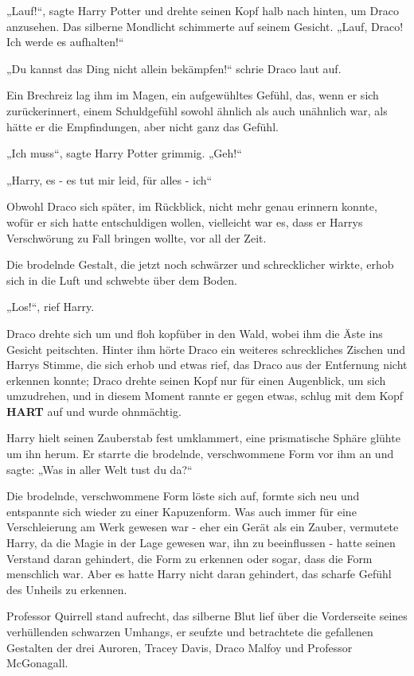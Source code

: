 {„Lauf!“, sagte Harry Potter und drehte seinen Kopf halb nach hinten, um Draco anzusehen. Das silberne Mondlicht schimmerte auf seinem Gesicht. „Lauf, Draco! Ich werde es aufhalten!“

„Du kannst das Ding nicht allein bekämpfen!“ schrie Draco laut auf.

Ein Brechreiz lag ihm im Magen, ein aufgewühltes Gefühl, das, wenn er sich zurückerinnert, einem Schuldgefühl sowohl ähnlich als auch unähnlich war, als hätte er die Empfindungen, aber nicht ganz das Gefühl.

„Ich muss“, sagte Harry Potter grimmig. „Geh!“

„Harry, es - es tut mir leid, für alles - ich“

Obwohl Draco sich später, im Rückblick, nicht mehr genau erinnern konnte, wofür er sich hatte entschuldigen wollen, vielleicht war es, dass er Harrys Verschwörung zu Fall bringen wollte, vor all der Zeit.

Die brodelnde Gestalt, die jetzt noch schwärzer und schrecklicher wirkte, erhob sich in die Luft und schwebte über dem Boden.

„Los!“, rief Harry.

Draco drehte sich um und floh kopfüber in den Wald, wobei ihm die Äste ins Gesicht peitschten. Hinter ihm hörte Draco ein weiteres schreckliches Zischen und Harrys Stimme, die sich erhob und etwas rief, das Draco aus der Entfernung nicht erkennen konnte; Draco drehte seinen Kopf nur für einen Augenblick, um sich umzudrehen, und in diesem Moment rannte er gegen etwas, schlug mit dem Kopf \textbf{HART} auf und wurde ohnmächtig.

Harry hielt seinen Zauberstab fest umklammert, eine prismatische Sphäre glühte um ihn herum. Er starrte die brodelnde, verschwommene Form vor ihm an und sagte: „Was in aller Welt tust du da?“

Die brodelnde, verschwommene Form löste sich auf, formte sich neu und entspannte sich wieder zu einer Kapuzenform. Was auch immer für eine Verschleierung am Werk gewesen war - eher ein Gerät als ein Zauber, vermutete Harry, da die Magie in der Lage gewesen war, ihn zu beeinflussen - hatte seinen Verstand daran gehindert, die Form zu erkennen oder sogar, dass die Form menschlich war. Aber es hatte Harry nicht daran gehindert, das scharfe Gefühl des Unheils zu erkennen.

Professor Quirrell stand aufrecht, das silberne Blut lief über die Vorderseite seines verhüllenden schwarzen Umhangs, er seufzte und betrachtete die gefallenen Gestalten der drei Auroren, Tracey Davis, Draco Malfoy und Professor McGonagall.

}
